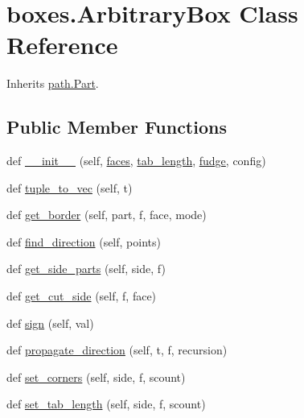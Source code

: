 \hypertarget{classboxes_1_1_arbitrary_box}{}\section{boxes.\+Arbitrary\+Box Class Reference}
\label{classboxes_1_1_arbitrary_box}


Inherits \hyperlink{classpath_1_1_part}{path.\+Part}.

\subsection*{Public Member Functions}
\begin{DoxyCompactItemize}
\item 
def \hyperlink{classboxes_1_1_arbitrary_box_a0bf5dfd8e5bc77184583127a1bd4dc2b}{\+\_\+\+\_\+init\+\_\+\+\_\+} (self, \hyperlink{classboxes_1_1_arbitrary_box_ab67b4c269874e7134565eb3338355e3d}{faces}, \hyperlink{classboxes_1_1_arbitrary_box_aa3f4f131456dc23999d99a422041c842}{tab\+\_\+length}, \hyperlink{classboxes_1_1_arbitrary_box_af7c0c8c6ebca710aa27785317764f8d3}{fudge}, config)
\item 
def \hyperlink{classboxes_1_1_arbitrary_box_a821fecbe31d7f119b15f6fc4c632dfbb}{tuple\+\_\+to\+\_\+vec} (self, t)
\item 
def \hyperlink{classboxes_1_1_arbitrary_box_a5a3b9b3a0883b166ecd1cb69b939b89f}{get\+\_\+border} (self, part, f, face, mode)
\item 
def \hyperlink{classboxes_1_1_arbitrary_box_abec459d0466c9f1a56a92cdd707c949b}{find\+\_\+direction} (self, points)
\item 
def \hyperlink{classboxes_1_1_arbitrary_box_a68bd120dd123135c346fb87ef61b2aa1}{get\+\_\+side\+\_\+parts} (self, side, f)
\item 
def \hyperlink{classboxes_1_1_arbitrary_box_a389b98b978697efa0687f0fa706e791d}{get\+\_\+cut\+\_\+side} (self, f, face)
\item 
def \hyperlink{classboxes_1_1_arbitrary_box_a57bd2d3c2e315a7615c7340edb7ebb11}{sign} (self, val)
\item 
def \hyperlink{classboxes_1_1_arbitrary_box_a7964ab53bc41a083704f111c9b9c05d2}{propagate\+\_\+direction} (self, t, f, recursion)
\item 
def \hyperlink{classboxes_1_1_arbitrary_box_a1cb83b2e5910298b4c4d4d72131044b3}{set\+\_\+corners} (self, side, f, scount)
\item 
def \hyperlink{classboxes_1_1_arbitrary_box_a5e7fe3b2283ec34c3bf580e3615b9b4f}{set\+\_\+tab\+\_\+length} (self, side, f, scount)

\end{DoxyCompactItemize}
